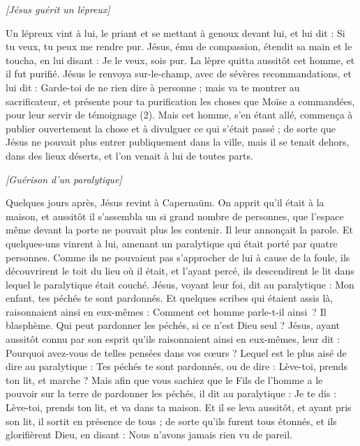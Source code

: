 \begin{multicols}{2}
\begin{center}
\textit{[Jésus guérit un lépreux]}
\end{center}
\PPE{}
Un lépreux vint à lui, le priant et se mettant à genoux devant lui, et lui dit : Si tu veux, tu peux me rendre pur.
Jésus, ému de compassion, étendit sa main et le toucha, en lui disant : Je le veux, sois pur.
La lèpre quitta aussitôt cet homme, et il fut purifié.
Jésus le renvoya sur-le-champ, avec de sévères recommandations,
et lui dit : Garde-toi de ne rien dire à personne ; mais va te montrer au sacrificateur, et présente pour ta purification les choses que Moïse a commandées, pour leur servir de témoignage (2).
Mais cet homme, s’en étant allé, commença à publier ouvertement la chose et à divulguer ce qui s'était passé ; de sorte que Jésus ne pouvait plus entrer publiquement dans la ville, mais il se tenait dehors, dans des lieux déserts, et l’on venait à lui de toutes parts.
\begin{center}
\textit{[Guérison d'un paralytique]}
\end{center}
\VerseOne{}Quelques jours après, Jésus revint à Capernaüm. On apprit qu'il était à la maison,
et aussitôt il s’assembla un si grand nombre de personnes, que l'espace même devant la porte ne pouvait plus les contenir. Il leur annonçait la parole.
Et quelques-uns vinrent à lui, amenant un paralytique qui était porté par quatre personnes.
Comme ils ne pouvaient pas s’approcher de lui à cause de la foule, ils découvrirent le toit du lieu où il était, et l'ayant percé, ils descendirent le lit dans lequel le paralytique était couché.
Jésus, voyant leur foi, dit au paralytique : Mon enfant, tes péchés te sont pardonnés.
Et quelques scribes qui étaient assis là, raisonnaient ainsi en eux-mêmes :
Comment cet homme parle-t-il ainsi ? Il blasphème. Qui peut pardonner les péchés, si ce n’est Dieu seul ?
Jésus, ayant aussitôt connu par son esprit qu'ils raisonnaient ainsi en eux-mêmes, leur dit : Pourquoi avez-vous de telles pensées dans vos cœurs ?
Lequel est le plus aisé de dire au paralytique : Tes péchés te sont pardonnés, ou de dire : Lève-toi, prends ton lit, et marche ?
Mais afin que vous sachiez que le Fils de l'homme a le pouvoir sur la terre de pardonner les péchés, il dit au paralytique :
Je te dis : Lève-toi, prends ton lit, et va dans ta maison.
Et il se leva aussitôt, et ayant pris son lit, il sortit en présence de tous ; de sorte qu'ils furent tous étonnés, et ils glorifièrent Dieu, en disant : Nous n’avons jamais rien vu de pareil.

\end{multicols}
